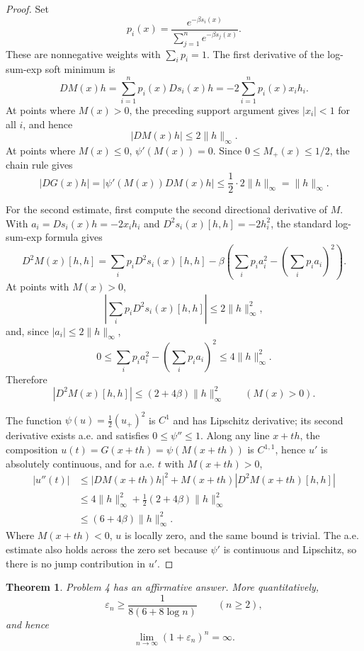 \documentclass[11pt]{article}
\newtheorem{theorem}{Theorem}
\begin{document}
\begin{proof}
Set
\[
        p_i(x)=\frac{e^{-\beta s_i(x)}}
        {\sum_{j=1}^n e^{-\beta s_j(x)}}.
\]
These are nonnegative weights with $\sum_i p_i=1$.  The first derivative of
the log-sum-exp soft minimum is
\[
        DM(x)h=\sum_{i=1}^n p_i(x)Ds_i(x)h
              =-2\sum_{i=1}^n p_i(x)x_i h_i.
\]
At points where $M(x)>0$, the preceding support argument gives $|x_i|<1$ for
all $i$, and hence
\[
        |DM(x)h|\le 2\|h\|_\infty.
\]
At points where $M(x)\le0$, $\psi'(M(x))=0$.  Since
$0\le M_+(x)\le 1/2$, the chain rule gives
\[
        |DG(x)h|=|\psi'(M(x))DM(x)h|
        \le \frac{1}{2}\cdot 2\|h\|_\infty
        =\|h\|_\infty .
\]

For the second estimate, first compute the second directional derivative of
$M$.  With $a_i=Ds_i(x)h=-2x_i h_i$ and
$D^2s_i(x)[h,h]=-2h_i^2$, the standard log-sum-exp formula gives
\[
D^2M(x)[h,h]
 =\sum_i p_iD^2s_i(x)[h,h]
 -\beta\left(\sum_i p_i a_i^2-\left(\sum_i p_i a_i\right)^2\right).
\]
At points with $M(x)>0$,
\[
        \left|\sum_i p_iD^2s_i(x)[h,h]\right|
        \le 2\|h\|_\infty^2,
\]
and, since $|a_i|\le2\|h\|_\infty$,
\[
        0\le
        \sum_i p_i a_i^2-\left(\sum_i p_i a_i\right)^2
        \le 4\|h\|_\infty^2.
\]
Therefore
\[
        |D^2M(x)[h,h]|
        \le (2+4\beta)\|h\|_\infty^2
        \qquad(M(x)>0).
\]

The function $\psi(u)=\frac12(u_+)^2$ is $C^1$ and has Lipschitz derivative;
its second derivative exists a.e. and satisfies $0\le\psi''\le1$.  Along any
line $x+th$, the composition $u(t)=G(x+th)=\psi(M(x+th))$ is $C^{1,1}$, hence
$u'$ is absolutely continuous, and for a.e. $t$ with $M(x+th)>0$,
\[
\begin{aligned}
 |u''(t)|
 &\le |DM(x+th)h|^2
      + M(x+th)|D^2M(x+th)[h,h]|        \\
 &\le 4\|h\|_\infty^2
      + \frac{1}{2}(2+4\beta)\|h\|_\infty^2 \\
 &\le (6+4\beta)\|h\|_\infty^2.
\end{aligned}
\]
Where $M(x+th)<0$, $u$ is locally zero, and the same bound is trivial.  The
a.e. estimate also holds across the zero set because $\psi'$ is continuous and
Lipschitz, so there is no jump contribution in $u'$.
\end{proof}

\begin{theorem}
Problem 4 has an affirmative answer.  More quantitatively,
\[
        \varepsilon_n\ge \frac{1}{8(6+8\log n)}
        \qquad(n\ge2),
\]
and hence
\[
        \lim_{n\to\infty}(1+\varepsilon_n)^n=\infty.
\]
\end{theorem}
\end{document}
